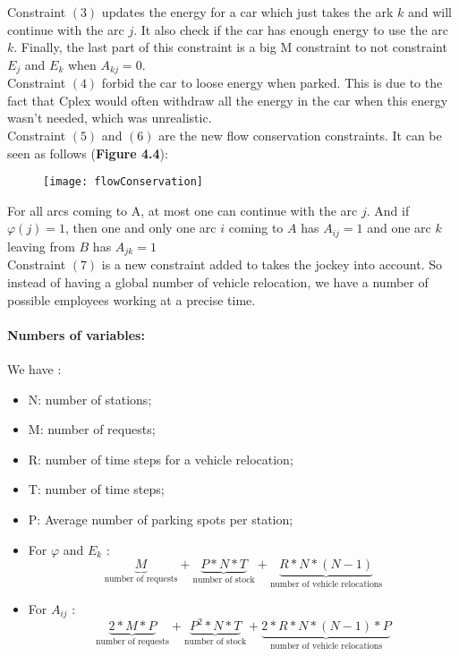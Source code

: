 \begin{bibunit}[ieeetr]
Constraint $(3)$ updates the energy for a car which just takes the ark $k$ and will continue with the arc $j$.
It also check if the car has enough energy to use the arc $k$.
Finally, the last part of this constraint is a big M constraint to not constraint $E_{j}$ and $E_{k}$ when $A_{kj} = 0$.\\
Constraint $(4)$ forbid the car to loose energy when parked.
This is due to the fact that Cplex would often withdraw all the energy in the car when this energy wasn't needed, which was unrealistic.\\
Constraint $(5)$ and $(6)$ are the new flow conservation constraints.
It can be seen as follows (\textbf{Figure 4.4}):

\begin{figure}[!h]
\texttt{[image: flowConservation]}
\end{figure}

For all arcs coming to A, at most one can continue with the arc $j$.
And if $\varphi (j)= 1$, then one and only one arc $i$ coming to $A$ has $A_{ij} = 1$ and one arc $k$ leaving from $B$ has $A_{jk} = 1$\\
Constraint $(7)$ is a new constraint added to takes the jockey into account.
So instead of having a global number of vehicle relocation, we have a number of possible employees working at a precise time.

\paragraph{Numbers of variables:}
We have : 
\begin{itemize}
\item N: number of stations;
\item M: number of requests;
\item R: number of time steps for a vehicle relocation;
\item T: number of time steps;
\item P: Average number of parking spots per station;
\item For $\varphi$ and  $E_{k}$ : $$\underbrace{M}_\textrm{number of requests} + \underbrace{P * N * T}_\textrm{number of stock} + \underbrace{R * N * (N -1)}_\textrm{number of vehicle relocations}$$
\item For $A_{ij}$ : $$\underbrace{2 * M * P }_\textrm{number of requests} + \underbrace{P^{2} * N * T}_\textrm{number of stock} + \underbrace{2* R * N * (N -1) * P}_\textrm{number of vehicle relocations}$$
\end{itemize}


\end{bibunit}
